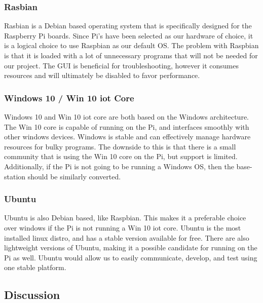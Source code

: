 \documentclass[letterpaper, 10, draftclsnofoot, onecolumn, compsoc]{IEEEtran}
\begin{document}
\subsubsection{Rasbian}

Rasbian\cite{r5} is a Debian based operating system that is specifically 
designed for the Raspberry Pi boards. Since Pi's have been selected 
as our hardware of choice, it is a logical choice to use Raspbian as 
our default OS. The problem with Raspbian is that it is loaded with 
a lot of unnecessary programs that will not be needed for our 
project. The GUI is beneficial for troubleshooting, however it 
consumes resources and will ultimately be disabled to favor 
performance. 


\subsubsection{Windows 10 / Win 10 iot Core}

Windows 10 and Win 10 iot core\cite{r6} are both based on the Windows 
architecture. The Win 10 core is capable of running on the Pi, and 
interfaces smoothly with other windows devices. Windows is stable 
and can effectively manage hardware resources for bulky programs. 
The downside to this is that there is a small community that is 
using the Win 10 core on the Pi, but support is limited. 
Additionally, if the Pi is not going to be running a Windows OS, 
then the base-station should be similarly converted. 


\subsubsection{Ubuntu}

Ubuntu\cite{r7} is also Debian based, like Raspbian. This makes it a 
preferable choice over windows if the Pi is not running a Win 10 
iot core. Ubuntu is the most installed linux distro, and has a 
stable version available for free. There are also lightweight 
versions of Ubuntu, making it a possible candidate for running on 
the Pi as well. Ubuntu would allow us to easily communicate, 
develop, and test using one stable platform.  


\subsection{Discussion}
\end{document}

